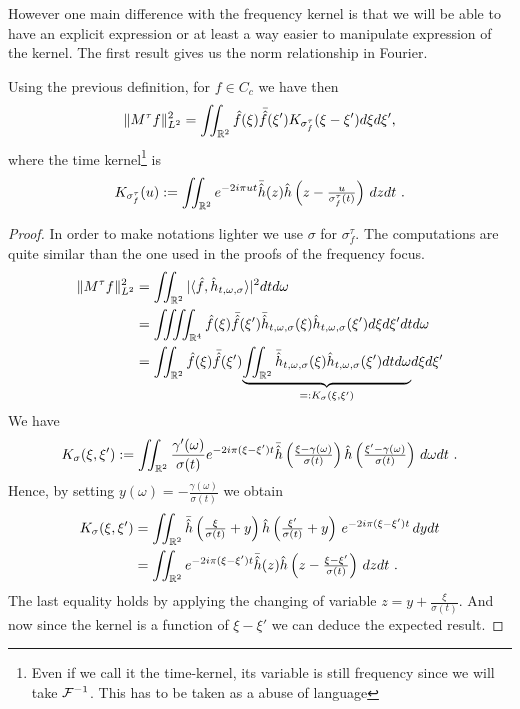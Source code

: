 However one main difference with the frequency kernel is that we will be able to have an explicit expression or at least a way easier to manipulate expression of the kernel. The first result gives us the norm relationship in Fourier.

\begin{prop}
    Using the previous definition, for $f\in C_c$ we have then
	\begin{equation}
		\|M^\tau f\|_{L^2}^2 = \iint_{\mathbb{R}^2} \hat{f}(\xi)\bar{\hat{f}}(\xi') K_{\sigma_f^\tau}(\xi-\xi') d\xi d\xi',
	\end{equation}
	where the time kernel\footnote{Even if we call it the time-kernel, its variable is still frequency since we will take $\mathcal{F}^{-1}$. This has to be taken as a abuse of language} is 
	\begin{equation}\label{eq_def_time_kernel}
		K_{\sigma_f^\tau}(u) := \iint_{\mathbb{R}^2}e^{-2i\pi u t}\bar{\hat{h}}(z)\hat{h}\left(z-\tfrac{u}{\sigma_f^\tau(t)}\right)\, dzdt\ .
	\end{equation}
\end{prop}
\begin{proof}
	In order to make notations lighter we use $\sigma$ for $\sigma_f^\tau$. The computations are quite similar than the one used in the proofs of the frequency focus.
	\begin{align*}
		\|M^\tau f\|_{L^2}^2 & = \iint_{\mathbb{R}^2} |\langle \hat{f},\hat{h}_{t,\omega,\sigma}\rangle|^2dtd\omega \\
		& = \iiiint_{\mathbb{R}^4} \hat{f}(\xi)\bar{\hat{f}}(\xi')\bar{\hat{h}}_{t,\omega,\sigma}(\xi)\hat{h}_{t,\omega,\sigma}(\xi') d\xi d\xi' dt d\omega \\
		& = \iint_{\mathbb{R}^2}\hat{f}(\xi)\bar{\hat{f}}(\xi') \underset{=:K_{\sigma}(\xi,\xi')}{\underbrace{\iint_{\mathbb{R}^2}\bar{\hat{h}}_{t,\omega,\sigma}(\xi)\hat{h}_{t,\omega,\sigma}(\xi')dt d\omega}} d\xi d\xi'
	\end{align*}
	We have
	\begin{equation*}
		K_{\sigma}(\xi,\xi'):= \iint_{\mathbb{R}^2}\frac{\gamma'(\omega)}{\sigma(t)}e^{-2i\pi(\xi-\xi')t}\bar{\hat{h}}\left(\tfrac{\xi-\gamma(\omega)}{\sigma(t)}\right)\hat{h}\left(\tfrac{\xi'-\gamma(\omega)}{\sigma(t)}\right)\,d\omega dt\ .
	\end{equation*}
	Hence, by setting $y(\omega)=-\frac{\gamma(\omega)}{\sigma(t)}$ we obtain
	\begin{align*}
		K_{\sigma}(\xi,\xi') &= \iint_{\R^2} \bar{\hat{h}}\left(\tfrac{\xi}{\sigma(t)}+y\right)\hat{h}\left(\tfrac{\xi'}{\sigma(t)}+y\right)\,e^{-2i\pi(\xi-\xi')t}\,dydt \\
		&= \iint_{\R^2}e^{-2i\pi(\xi-\xi')t} \bar{\hat{h}}(z)\hat{h}\left(z-\tfrac{\xi-\xi'}{\sigma(t)}\right)\,dzdt\ .
	\end{align*}
	The last equality holds by applying the changing of variable $z=y+\frac{\xi}{\sigma(t)}$. And now since the kernel is a function of $\xi-\xi'$ we can deduce the expected result.
\end{proof}

